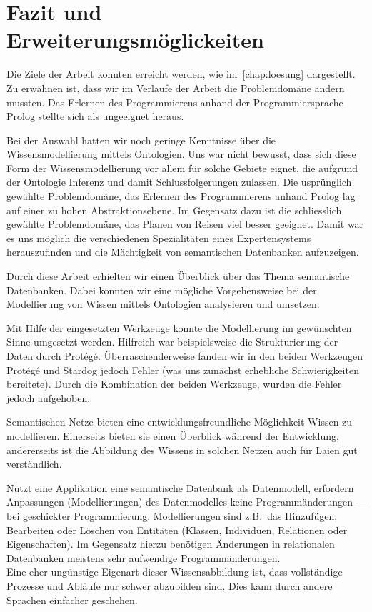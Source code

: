 \chapter{Fazit und Erweiterungsmöglickeiten}
\label{chap:fazit}


Die Ziele der Arbeit konnten erreicht werden, wie im~\autoref{chap:loesung} dargestellt. Zu erwähnen ist, dass wir im Verlaufe der Arbeit die Problemdomäne ändern mussten. Das Erlernen des Programmierens anhand der Programmiersprache Prolog stellte sich als ungeeignet heraus.

Bei der Auswahl hatten wir noch geringe Kenntnisse über die Wissensmodellierung mittels Ontologien. Uns war nicht bewusst, dass sich diese Form der Wissensmodellierung vor allem für solche Gebiete eignet, die aufgrund der Ontologie Inferenz und damit Schlussfolgerungen zulassen. Die usprünglich gewählte Problemdomäne, das Erlernen des Programmierens anhand Prolog lag auf einer zu hohen Abstraktionsebene. Im Gegensatz dazu ist die schliesslich gewählte Problemdomäne, das Planen von Reisen viel besser geeignet. Damit war es uns möglich die verschiedenen Spezialitäten eines Expertensystems herauszufinden und die Mächtigkeit von semantischen Datenbanken aufzuzeigen.

Durch diese Arbeit erhielten wir einen Überblick über das Thema semantische Datenbanken. Dabei konnten wir eine mögliche Vorgehensweise bei der Modellierung von Wissen mittels Ontologien analysieren und umsetzen.

Mit Hilfe der eingesetzten Werkzeuge konnte die Modellierung im gewünschten Sinne umgesetzt werden. Hilfreich war beispielsweise die Strukturierung der Daten durch Protégé.
Überraschenderweise fanden wir in den beiden Werkzeugen Protégé und Stardog jedoch Fehler (was uns zunächst erhebliche Schwierigkeiten bereitete). Durch die Kombination der beiden Werkzeuge, wurden die Fehler jedoch aufgehoben.

Semantischen Netze bieten eine entwicklungsfreundliche Möglichkeit Wissen zu modellieren. Einerseits bieten sie einen Überblick während der Entwicklung, andererseits ist die Abbildung des Wissens in solchen Netzen auch für Laien gut verständlich.

Nutzt eine Applikation eine semantische Datenbank als Datenmodell, erfordern Anpassungen (Modellierungen) des Datenmodelles keine Programmänderungen --- bei geschickter Programmierung. Modellierungen sind z.B.\ das Hinzufügen, Bearbeiten oder Löschen von Entitäten (Klassen, Individuen, Relationen oder Eigenschaften). Im Gegensatz hierzu benötigen Änderungen in relationalen Datenbanken meistens sehr aufwendige Programmänderungen.\\
Eine eher ungünstige Eigenart dieser Wissensabbildung ist, dass vollständige Prozesse und Abläufe nur schwer abzubilden sind. Dies kann durch andere Sprachen einfacher geschehen.

